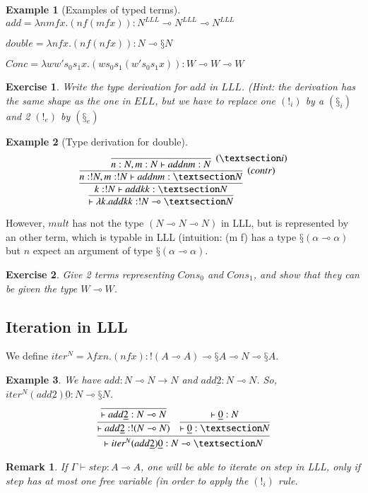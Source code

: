 \documentclass[a4paper,10pt]{article}
\newcommand{\impl}{\rightarrow}	%
\newcommand{\limpl}{\multimap}  %
\newtheorem{ex}{Example}
\newtheorem{exo}{Exercise}
\newtheorem{rmk}{Remark}
\begin{document}
\begin{ex}[Examples of typed terms]
\item $add = \lambda n m f x.(n f (m f x)): N^{LLL} \limpl N^{LLL} \limpl N^{LLL}$
\item $double = \lambda n f x.(n f (n f x)): N \limpl § N$
\item $Conc = \lambda w w' s_0 s_1 x.(w s_0 s_1 (w' s_0 s_1 x)) : W \limpl W \limpl W$
\end{ex}

\begin{exo}
Write the type derivation for $add$ in $LLL$.
(Hint: the derivation has the same shape as the one in $ELL$, but we have to replace one $(!_i)$ by a $(§_i)$ and 2 $(!_e)$ by $(§_e)$
\end{exo}

\begin{ex}[Type derivation for double]
$$ \infer{\vdash \lambda k.add k k: !N \limpl §N}{
		\infer{k:!N \vdash add k k: §N}{
			\infer[(contr)]{n:!N, m:!N \vdash add n m :§N}{
			\infer[(§i)]{n:N, m:N \vdash add n m:N}{}
		}
	}
} $$
\end{ex}

 However, $mult$ has not the type $(N \limpl N \limpl N)$ in LLL, but is represented by an other term, which is typable in LLL (intuition: (m f) has a type $§(\alpha \limpl \alpha)$ but $n$ expect an argument of type $§(\alpha \limpl \alpha)$.

\begin{exo}
Give 2 terms representing $Cons_0$ and $Cons_1$, and show that they can be given the type $W \limpl W$.
\end{exo}


\subsection{Iteration in LLL}
 We define $iter^N = \lambda f x n.(n f x): !(A \limpl A) \limpl §A \limpl N \limpl §A$.

\begin{ex}
We have $add: N \limpl N \impl N$ and $add \underbar{2} : N \limpl N$.
So, $iter^N (add \underbar{2}) \underbar{0} : N \limpl §N $.
$$ \infer{\vdash iter^N (add \underbar{2}) \underbar{0} : N \limpl §N}{
		\infer{\vdash add \underbar{2} : !(N \limpl N)}{
			\infer{\vdash add \underbar{2} : N \limpl N}{}
		}
		&
		\infer{\vdash \underbar{0} : §N}{ \vdash \underbar{0} : N}
	}$$
\end{ex}

\begin{rmk}
If $\Gamma \vdash step: A \limpl A$, one will be able to iterate on $step$ in LLL, only if $step$ has at most one free variable (in order to apply the $(!_i)$ rule.
\end{rmk}
\end{document}
